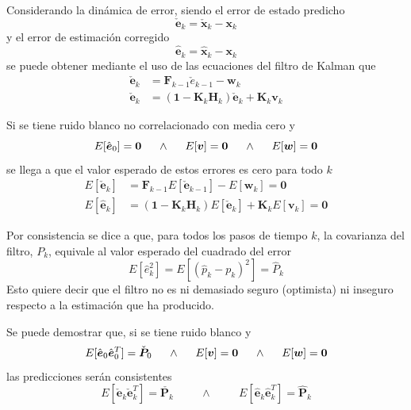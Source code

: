 Considerando la dinámica de error, siendo el error de estado predicho
\begin{equation}
    \check{\bm{e}}_k = \check{\bm{x}}_k - \bm{x}_k
\end{equation}
y el error de estimación corregido
\begin{equation}
    \hat{\bm{e}}_k = \hat{\bm{x}}_k - \bm{x}_k
\end{equation}
se puede obtener mediante el uso de las ecuaciones del filtro de Kalman que
\begin{align}
    \check{\bm{e}}_k &= \bm{F}_{k-1}\check{e}_{k-1} - \bm{w}_k \\
    \check{\bm{e}}_k &= \left(\bm{1} - \bm{K}_k\bm{H}_k\right)\check{\bm{e}}_k + \bm{K}_k\bm{v}_k
\end{align}

Si se tiene ruido blanco no correlacionado con media cero y
\begin{equation*}
    E[\hat{\bm{e}}_0] = \bm{0}\hspace{0.5cm}\land\hspace{0.5cm}E[\bm{v}] = \bm{0}\hspace{0.5cm}\land\hspace{0.5cm}E[\bm{w}] = \bm{0}
\end{equation*}
se llega a que el valor esperado de estos errores es cero para todo $k$
\begin{align}
    E[\check{\bm{e}}_k] &= \bm{F}_{k-1}E[\check{\bm{e}}_{k-1}] - E[\bm{w}_k] = \bm{0} \\
    E[\hat{\bm{e}}_k] &= \left(\bm{1} - \bm{K}_k\bm{H}_k\right)E[\check{\bm{e}}_k] + \bm{K}_k E[\bm{v}_k] = \bm{0}
\end{align}

Por consistencia se dice a que, para todos los pasos de tiempo $k$, la covarianza del filtro, $P_k$, equivale al valor esperado del cuadrado del error
\begin{equation}
    E[\hat{e}_k^2] = E[(\hat{p}_k - p_k)^2] = \hat{P}_k
\end{equation}
Esto quiere decir que el filtro no es ni demasiado seguro (optimista) ni inseguro respecto a la estimación que ha producido.

Se puede demostrar que, si se tiene ruido blanco y
\begin{equation*}
    E[\hat{\bm{e}}_0\hat{\bm{e}}_0^T] = \check{\bm{P}}_0\hspace{0.5cm}\land\hspace{0.5cm}E[\bm{v}] = \bm{0}\hspace{0.5cm}\land\hspace{0.5cm}E[\bm{w}] = \bm{0}
\end{equation*}
las predicciones serán consistentes
\begin{equation*}
    E[\check{\bm{e}}_k\check{\bm{e}}_k^T] = \check{\bm{P}_k}\hspace{1cm}\land\hspace{1cm}E[\hat{\bm{e}}_k\hat{\bm{e}}_k^T] = \hat{\bm{P}}_k
\end{equation*}

